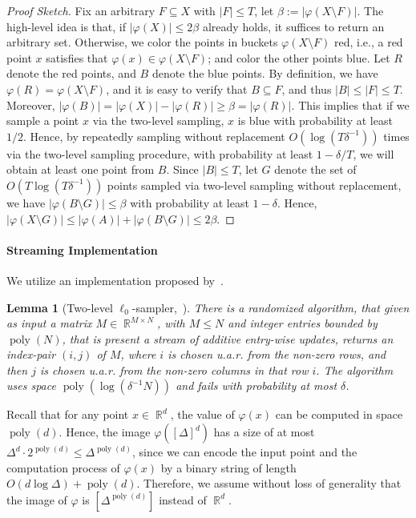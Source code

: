 \documentclass[letterpaper,11pt]{article}
\theoremstyle{plain}
\newtheorem{lemma}[theorem]{Lemma}
\theoremstyle{definition}
\theoremstyle{remark}
\DeclareMathOperator{\R}{\mathbb{R}}
\DeclareMathOperator{\poly}{poly}
\renewcommand{\phi}{\varphi}
\begin{document}
\begin{appendices}
\begin{proof}[Proof Sketch]
Fix an arbitrary $F\subseteq X$ with $|F|\le T$, let $\beta:= |\phi(X\setminus F) |$.
    The high-level idea is that, if $|\phi(X)|\le 2\beta$ already holds, it suffices to return an arbitrary set. Otherwise, we color the points in buckets $\phi(X\setminus F)$ red, i.e., a red point $x$ satisfies that $\phi(x)\in \phi(X\setminus F)$; and color the other points blue.
    Let $R$ denote the red points, and $B$ denote the blue points. By definition, we have $\phi(R)=\phi(X\setminus F)$, and it is easy to verify that $B\subseteq F$, and thus $|B|\le |F|\le T$. Moreover, $|\phi(B)| = |\phi(X)| - |\phi(R)|\ge \beta = |\phi(R)|$. This implies that if we sample a point $x$ via the two-level sampling, $x$ is blue with probability at least $1/2$. Hence, by repeatedly sampling without replacement $O(\log(T\delta^{-1}))$ times via the two-level sampling procedure, with probability at least $1-\delta/T$, we will obtain at least one point from $B$. Since $|B|\le T$, let $G$ denote the set of $O(T \log(T\delta^{-1}))$ points sampled via two-level sampling without replacement, we have $|\phi(B\setminus G)|\le \beta$ with probability at least $1-\delta$. Hence, $|\phi(X\setminus G)| \le |\phi(A) | + |\phi(B\setminus G) |\le 2\beta$.
\end{proof}

    \paragraph{Streaming Implementation}
    We utilize an implementation proposed by~\cite{arxiv.2204.02095}.
    \begin{lemma}[Two-level $\ell_0$-sampler,~{\cite[Lemma 3.3]{arxiv.2204.02095}}]
        \label{lem:two-level sampler}
        There is a randomized algorithm, that given as input a matrix $M\in \R^{M\times N}$, with $M\le N$ and integer entries bounded by $\poly(N)$, that is present a stream of additive entry-wise updates, returns an index-pair $(i,j)$ of $M$, where $i$ is chosen u.a.r. from the non-zero rows, and then $j$ is chosen u.a.r. from the non-zero columns in that row $i$. The algorithm uses space $\poly(\log (\delta^{-1}N))$ and fails with probability at most $\delta$.
    \end{lemma}
    Recall that for any point $x\in \R^d$, the value of $\phi(x)$ can be computed in space $\poly(d)$.
    Hence, the image $\phi([\Delta]^d)$ has a size of at most $\Delta^d \cdot 2^{\poly(d)}\le \Delta^{\poly(d)}$, since we can encode the input point and the computation process of $\phi(x)$ by a binary string of length $O(d\log\Delta) + \poly(d)$. 
    Therefore, we assume without loss of generality that the image of $\phi$ is $[\Delta^{\poly(d)}]$ instead of $\R^d$.
    

\end{appendices}
\end{document}
